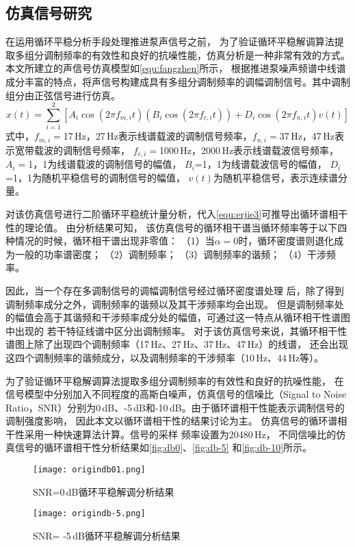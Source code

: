 \subsection{仿真信号研究}
在运用循环平稳分析手段处理推进泵声信号之前，
为了验证循环平稳解调算法提取多组分调制频率的有效性和良好的抗噪性能，仿真分析是一种非常有效的方式。
本文所建立的声信号仿真模型如\autoref{equ:fangzhen}所示，
根据推进泵噪声频谱中线谱成分丰富的特点，将声信号构建成具有多组分调制频率的调幅调制信号。其中调制组分由正弦信号进行仿真。
\begin{equation}
    \label{equ:fangzhen}
    x\left ( t \right ) =\sum_{i=1}^{2}\left [ A_{i}\cos \left ( 2\pi f_{m,i}t  \right )\left ( B_{i}\cos\left ( 2\pi f_{c,i}t  \right )   \right )+D_{i}\cos\left ( 2\pi f_{n,i}t  \right )v\left ( t \right )      \right ]  
\end{equation}
式中，$f_{m,i}=$17\,Hz，27\,Hz表示线谱载波的调制信号频率，$f_{n,i}=$37\,Hz，47\,Hz表示宽带载波的调制信号频率，
$f_{c,i}=$1000\,Hz，2000\,Hz表示线谱载波信号频率，$A_i=$1，1为线谱载波的调制信号的幅值，
$B_i$=1，1为线谱载波信号的幅值，
$D_i$=1，1为随机平稳信号的调制信号的幅值，
$v\left ( t \right )$为随机平稳信号，表示连续谱分量。

对该仿真信号进行二阶循环平稳统计量分析，代入\autoref{equ:erjie3}可推导出循环谱相干性的理论值。
由分析结果可知，
该仿真信号的循环相干谱当循环频率等于以下四种情况的时候，循环相干谱出现非零值：
（1）当$\alpha=0$时，循环密度谱则退化成为一般的功率谱密度；
（2）调制频率；
（3）调制频率的谐频；
（4）干涉频率。

因此，当一个存在多调制信号的调幅调制信号经过循环密度谱处理
后，除了得到调制频率成分之外，调制频率的谐频以及其干涉频率均会出现。
但是调制频率处的幅值会高于其谐频和干涉频率成分处的幅值，可通过这一特点从循环相干性谱图中出现的
若干特征线谱中区分出调制频率。
对于该仿真信号来说，其循环相干性谱图上除了出现四个调制频率（17\,Hz、27\,Hz、37\,Hz、47\,Hz）的线谱，
还会出现这四个调制频率的谐频成分，以及调制频率的干涉频率（10\,Hz、44\,Hz等）。

为了验证循环平稳解调算法提取多组分调制频率的有效性和良好的抗噪性能，
在信号模型中分别加入不同程度的高斯白噪声，仿真信号的信噪比（Signal to Noise 
Ratio，SNR）分别为0\,dB、-5\,dB和-10\,dB。由于循环谱相干性能表示调制信号的调制强度影响，
因此本文以循环谱相干性的结果讨论为主。
仿真信号的循环谱相干性采用一种快速算法计算\cite{antoniFastComputationSpectral2017}。信号的采样
频率设置为20480\,Hz，
不同信噪比的仿真信号的循环谱相干性分析结果如\autoref{fig:db0}、\autoref{fig:db-5}
和\autoref{fig:db-10}所示。
\begin{figure}[htbp]
    \centering
    \texttt{[image: origindb01.png]}
    \caption{\label{fig:db0}SNR=0\,dB循环平稳解调分析结果}
\end{figure}
\begin{figure}[htbp]
    \centering
    \texttt{[image: origindb-5.png]}
    \caption{\label{fig:db-5}SNR= -5\,dB循环平稳解调分析结果}
\end{figure}

